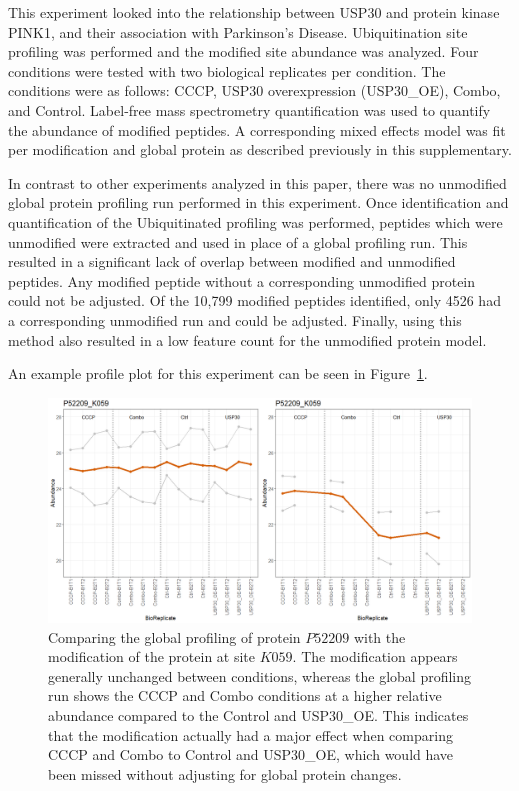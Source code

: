 \documentclass{mcp}
\def\sfigref#1{{Figure~\ref{#1}}}
\begin{document}
This experiment looked into the relationship between USP30 and protein kinase PINK1, and their association with Parkinson's Disease. Ubiquitination site profiling was performed and the modified site abundance was analyzed. Four conditions were tested with two biological replicates per condition. The conditions were as follows: CCCP, USP30 overexpression (USP30\_OE), Combo, and Control. Label-free mass spectrometry quantification was used to quantify the abundance of modified peptides. A corresponding mixed effects model was fit per modification and global protein as described previously in this supplementary.

In contrast to other experiments analyzed in this paper, there was no unmodified global protein profiling run performed in this experiment. Once identification and quantification of the Ubiquitinated profiling was performed, peptides which were unmodified were extracted and used in place of a global profiling run. This resulted in a significant lack of overlap between modified and unmodified peptides. Any modified peptide without a corresponding unmodified protein could not be adjusted. Of the 10,799 modified peptides identified, only 4526 had a corresponding unmodified run and could be adjusted. Finally, using this method also resulted in a low feature count for the unmodified protein model.

An example profile plot for this experiment can be seen in \sfigref{fig:USP30_profile_plot}.

\begin{figure}[h!]
\centering
\includegraphics[width=\textwidth]{sim_new/USP30_profile_plot}
\caption{Comparing the global profiling of protein $P52209$ with the modification of the protein at site $K059$. The modification appears generally unchanged between conditions, whereas the global profiling run shows the CCCP and Combo conditions at a higher relative abundance compared to the Control and USP30\_OE. This indicates that the modification actually had a major effect when comparing CCCP and Combo to Control and USP30\_OE, which would have been missed without adjusting for global protein changes.}
\label{fig:USP30_profile_plot}
\end{figure}
\clearpage
\end{document}
